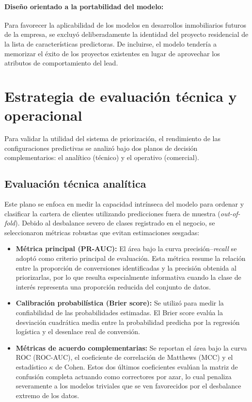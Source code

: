 \paragraph{Diseño orientado a la portabilidad del modelo:} Para favorecer la aplicabilidad de los modelos en desarrollos inmobiliarios futuros de la empresa, se excluyó deliberadamente la identidad del proyecto residencial de la lista de características predictoras. De incluirse, el modelo tendería a memorizar el éxito de los proyectos existentes en lugar de aprovechar los atributos de comportamiento del lead.

\section{Estrategia de evaluación técnica y operacional}
Para validar la utilidad del sistema de priorización, el rendimiento de las configuraciones predictivas se analizó bajo dos planos de decisión complementarios: el analítico (técnico) y el operativo (comercial).

\subsection{Evaluación técnica analítica}
Este plano se enfoca en medir la capacidad intrínseca del modelo para ordenar y clasificar la cartera de clientes utilizando predicciones fuera de muestra (\emph{out-of-fold}). Debido al desbalance severo de clases registrado en el negocio, se seleccionaron métricas robustas que evitan estimaciones sesgadas:
\begin{itemize}
    \item \textbf{Métrica principal (PR-AUC):} El área bajo la curva precisión--\emph{recall} se adoptó como criterio principal de evaluación. Esta métrica resume la relación entre la proporción de conversiones identificadas y la precisión obtenida al priorizarlas, por lo que resulta especialmente informativa cuando la clase de interés representa una proporción reducida del conjunto de datos.    \item \textbf{Calibración probabilística (Brier score):} Se utilizó para medir la confiabilidad de las probabilidades estimadas. El Brier score evalúa la desviación cuadrática media entre la probabilidad predicha por la regresión logística y el desenlace real de conversión.
    \item \textbf{Métricas de acuerdo complementarias:} Se reportan el área bajo la curva ROC (ROC-AUC), el coeficiente de correlación de Matthews (MCC) y el estadístico $\kappa$ de Cohen. Estos dos últimos coeficientes evalúan la matriz de confusión completa actuando como correctores por azar, lo cual penaliza severamente a los modelos triviales que se ven favorecidos por el desbalance extremo de los datos.
\end{itemize}

